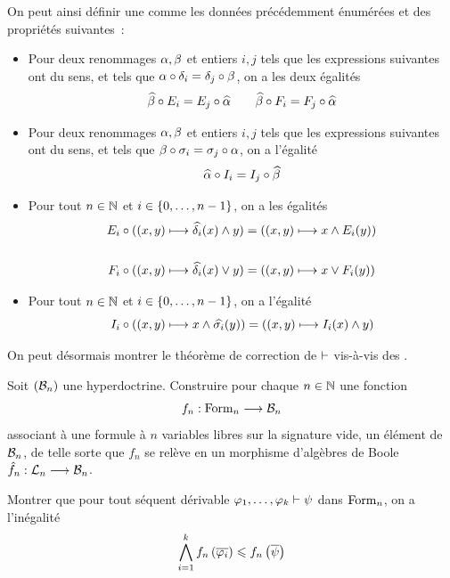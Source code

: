 \begin{problem}
  On peut ainsi définir une  comme les données
  précédemment énumérées et des propriétés suivantes~:
  \begin{itemize}
  \item Pour deux renommages $\alpha,\beta$ et entiers $i,j$ tels que les
    expressions suivantes ont du sens, et tels que
    $\alpha\circ \delta_i = \delta_j\circ \beta$, on a les deux égalités
    \[\widehat{\beta}\circ E_i = E_j\circ\widehat{\alpha}\qquad
    \widehat{\beta}\circ F_i = F_j\circ\widehat{\alpha}\]
  \item Pour deux renommages $\alpha,\beta$ et entiers $i,j$ tels que les
    expressions suivantes ont du sens, et tels que
    $\beta\circ \sigma_i = \sigma_j\circ \alpha$, on a l'égalité
    \[\widehat{\alpha}\circ I_i = I_j \circ\widehat{\beta}\]
  \item Pour tout $n \in \mathbb N$ et $i\in\{0,\ldots,n - 1\}$, on a les égalités
    \begin{align*}
      E_i\circ ((x,y) \longmapsto \widehat{\delta_i}(x) \wedge y) &=
      ((x,y) \longmapsto x \wedge E_i(y))\\ \\
      F_i\circ ((x,y) \longmapsto \widehat{\delta_i}(x) \vee y) &=
      ((x,y) \longmapsto x \vee F_i(y))
    \end{align*}
  \item Pour tout $n \in \mathbb N$ et $i\in\{0,\ldots,n - 1\}$, on a l'égalité
    \[I_i\circ ((x,y)\longmapsto x\wedge \widehat{\sigma_i}(y)) =
    ((x,y) \longmapsto I_i(x)\wedge y)\]
  \end{itemize}
  
  On peut désormais montrer le théorème de correction de $\vdash$ vis-à-vis des
  .
  \begin{pbQuest}[resume]
  \item Soit $(\mathcal{B}_n)$ une hyperdoctrine. Construire pour chaque $n\in\mathbb N$
    une fonction
    \[f_n : \displaystyle \operatorname{Form}_n \longrightarrow \mathcal{B}_n\]
    associant à une formule à $n$ variables libres sur la signature vide, un
    élément de $\mathcal{B}_n$, de telle sorte que $f_n$ se relève en un morphisme
    d'algèbres de Boole $\hat{f}_n : \displaystyle \mathcal{L}_n \longrightarrow \mathcal{B}_n$.
  \item Montrer que pour tout séquent dérivable
    $\varphi_1,\ldots,\varphi_k\vdash\psi$ dans $\operatorname{Form}_n$, on a l'inégalité
    \[\bigwedge_{i = 1}^{k} f_n\left(\overline{\varphi_i}\right) \leqslant
    f_n\left(\overline{\psi}\right)\]
  \end{pbQuest}
\end{problem}

